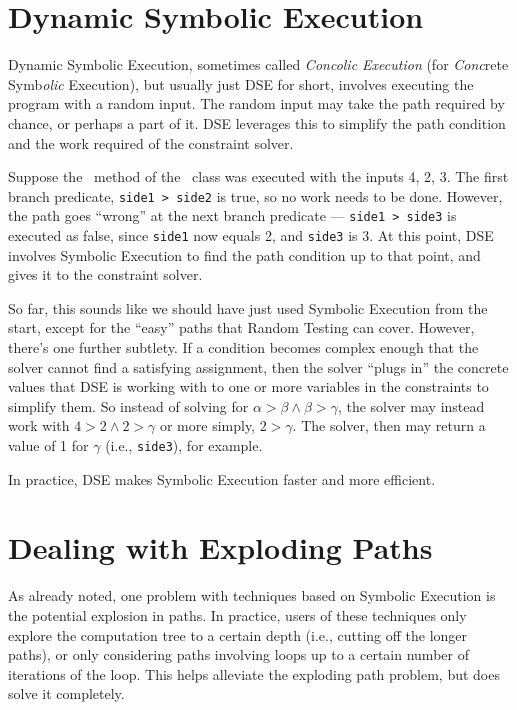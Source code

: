 \section{Dynamic Symbolic Execution}

Dynamic Symbolic Execution, sometimes called {\it Concolic Execution} (for {\it
Conc}rete Symb{\it olic} Execution), but usually just DSE for short, involves
executing the program with a random input. The random input may take the path
required by chance, or perhaps a part of it. DSE leverages this to simplify the
path condition and the work required of the constraint solver. 

Suppose the \classifymethod~method of the \triangleclass~class was executed with
the inputs 4, 2, 3. The first branch predicate, {\tt side1 > side2} is true, so
no work needs to be done. However, the path goes ``wrong'' at the next branch
predicate --- {\tt side1 > side3} is executed as false, since {\tt side1} now
equals 2, and {\tt side3} is 3. At this point, DSE involves Symbolic Execution
to find the path condition up to that point, and gives it to the constraint
solver. 

So far, this sounds like we should have just used Symbolic Execution from the
start, except for the ``easy'' paths that Random Testing can cover. However,
there’s one further subtlety. If a condition becomes complex enough that the
solver cannot find a satisfying assignment, then the solver ``plugs in'' the
concrete values that DSE is working with to one or more variables in the
constraints to simplify them. So instead of solving for $\alpha > \beta \wedge
\beta > \gamma$, the solver may instead work with $4 > 2 \wedge 2 > \gamma$ or
more simply, $2 > \gamma$. The solver, then may return a value of 1 for $\gamma$
(i.e., {\tt side3}), for example.

In practice, DSE makes Symbolic Execution faster and more efficient. 

\section{Dealing with Exploding Paths}

As already noted, one problem with techniques based on Symbolic Execution is the
potential explosion in paths. In practice, users of these techniques only
explore the computation tree to a certain depth (i.e., cutting off the longer
paths), or only considering paths involving loops up to a certain number of
iterations of the loop. This helps alleviate the exploding path problem, but
does solve it completely.

